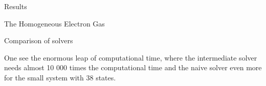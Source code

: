 \documentclass[twoside,english]{uiofysmaster}
\begin{document}
\begin{chapter}{Results}
\begin{section}{The Homogeneous Electron Gas}
\begin{subsection}{Comparison of solvers}
\begin{table}[H]
				\caption{Calculations on the Homogeneous electron gas, using three different implementations of CCD equations. Showing time needed for every solver to calculate results in figure (\ref{table:CompareSolversHEG}. The System has been calculated with $2$ or $14$ particles and the total states either $38$ or $54$. The calculations has been made with a relaxing factor of $0.3$ and $r_s = 1.0$. Results found in file \textit{CompareTimeNaiveBlock.txt} \cite{WholmenGithub}}
				\label{table:CompareSolversTimeHEG}
			\end{table}
			One see the enormous leap of computational time, where the intermediate solver needs almost 10 000 times the computational time and the naive solver even more for the small system with $38$ states. 
		\end{subsection}
 		

\end{section}
\end{chapter}
\end{document}
